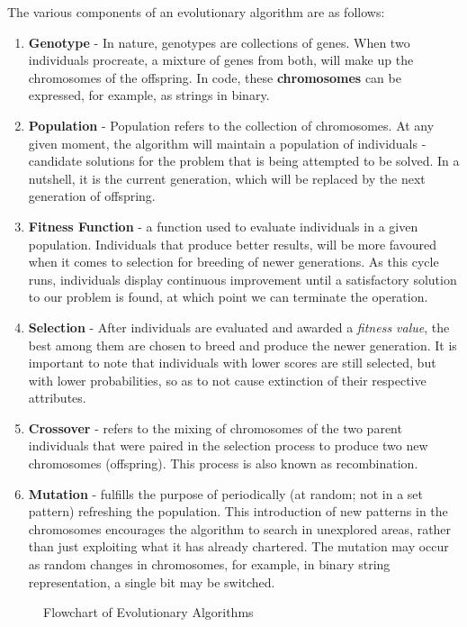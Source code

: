 \documentclass[conference,compsoc]{IEEEtran}
\begin{document}
The various components of an evolutionary algorithm are as follows:
\begin{enumerate}
    \item \textbf{Genotype} - In nature, genotypes are collections of genes. When two individuals procreate, a mixture of genes 
    from both, will make up the chromosomes of the offspring. In code, these \textbf{chromosomes} 
    can be expressed, for example, as strings in binary. 
    \item \textbf{Population} - Population refers to the collection of chromosomes. At any given moment, the 
    algorithm will maintain a population of individuals - candidate solutions for the problem that is being attempted 
    to be solved. In a nutshell, it is the current generation, which will be replaced by the next generation of offspring. 
    \item \textbf{Fitness Function} - a function used to evaluate individuals in a given population. Individuals 
    that produce better results, will be more favoured when it comes to selection for breeding of newer generations. As this cycle runs, 
    individuals display continuous improvement until a satisfactory solution to our problem is found, at which point we can terminate the operation.
    \item \textbf{Selection} - After individuals are evaluated and awarded a \textit{fitness value}, 
    the best among them are chosen to breed and produce the newer generation. It is important to note 
    that individuals with lower scores are still selected, but with lower probabilities, so as to not 
    cause extinction of their respective attributes.
    \item \textbf{Crossover} - refers to the mixing of chromosomes of the two parent individuals 
    that were paired in the selection process to produce two new chromosomes (offspring). This process is also known as recombination.
    \item \textbf{Mutation} - fulfills the purpose of periodically (at random; not in a set pattern) refreshing 
    the population. This introduction of new patterns in the chromosomes encourages the algorithm to search in unexplored areas, rather than 
    just exploiting what it has already chartered. The mutation may occur as random changes in chromosomes, for example, in binary string 
    representation, a single bit may be switched.
\end{enumerate}
\begin{figure}[h]
  \centering
  \caption{Flowchart of Evolutionary Algorithms}
\end{figure}
\setlength{\parskip}{0 em}
\end{document}
